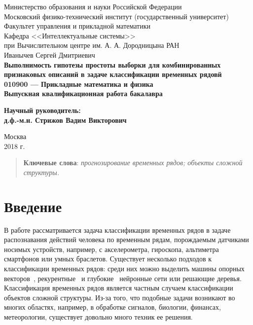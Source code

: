 \documentclass[12pt,fleqn,unicode]{article}
\begin{document}
{
\renewcommand{\baselinestretch}{1}
\thispagestyle{empty}
\begin{center}
    \sc
        Министерство образования и науки Российской Федерации\\
        Московский физико-технический институт
        {\rm(государственный университет)}\\
        Факультет управления и прикладной математики\\
        Кафедра <<Интеллектуальные системы>>\\
        при Вычислительном центре им. А. А. Дородницына РАН\\[35mm]
    \rm\large
        Иванычев Сергей Дмитриевич\\[10mm]
    \bf\Large
    Выполнимость гипотезы простоты выборки для комбинированных
признаковых описаний в задаче классификации временных рядовй\\[10mm]
    \rm\normalsize
        010900 — Прикладные математика и физика\\[10mm]
    \sc
        Выпускная квалификационная работа бакалавра\\[30mm]
\end{center}
\hfill\parbox{80mm}{
    \begin{flushleft}
    \bf
        Научный руководитель:\\
    \rm
        д.ф.-м.н. Стрижов Вадим Викторович\\[4.9cm]
    \end{flushleft}
}
\begin{center}
    Москва\\
    2018 г.
\end{center}
}

\newpage
\tableofcontents

\newpage
\begin{abstract}


  \bigskip
    \textbf{Ключевые слова}: \emph{прогнозирование временных рядов; объекты сложной структуры.}
\end{abstract}

\newpage
\section{Введение}


В работе рассматривается задача классификации временных рядов в задаче
распознавания действий человека по временным рядам,
порождаемым датчиками носимых устройств, например, с акселерометра, гироскопа,
альтиметра смартфонов или умных браслетов. Существует несколько подходов к
классификации временных рядов: среди них можно выделить машины опорных
векторов~\cite{Kampouraki2009, Eads2002},
рекурентные~\cite{Husken2003} и глубокие~\cite{Zheng2014} нейронные сети или
решающие деревья.
Классификация временных рядов является частным случаем классификации
объектов сложной структуры. Из-за того, что подобные задачи возникают во
многих областях, например, в обработке сигналов, биологии, финансах,
метеорологии, существует довольно много техник ее решения.
\end{document}
